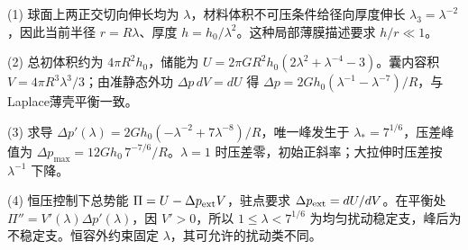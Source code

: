 (1) 球面上两正交切向伸长均为 \(\lambda\)，材料体积不可压条件给径向厚度伸长 \(\lambda_3=\lambda^{-2}\)，因此当前半径 \(r=R\lambda\)、厚度 \(h=h_0/\lambda^2\)。这种局部薄膜描述要求 \(h/r\ll1\)。

(2) 总初体积约为 \(4\pi R^2h_0\)，储能为 \(U=2\pi GR^2h_0(2\lambda^2+\lambda^{-4}-3)\)。囊内容积 \(V=4\pi R^3\lambda^3/3\)；由准静态外功 \(\Delta p\,dV=dU\) 得 \(\Delta p=2Gh_0(\lambda^{-1}-\lambda^{-7})/R\)，与Laplace薄壳平衡一致。

(3) 求导 \(\Delta p'(\lambda)=2Gh_0(-\lambda^{-2}+7\lambda^{-8})/R\)，唯一峰发生于 \(\lambda_*=7^{1/6}\)，压差峰值为 \(\Delta p_{\max}=12Gh_0\,7^{-7/6}/R\)。\(\lambda=1\) 时压差零，初始正斜率；大拉伸时压差按 \(\lambda^{-1}\) 下降。

(4) 恒压控制下总势能 \(\Pi=U-\Delta p_{\rm ext}V\)，驻点要求 \(\Delta p_{\rm ext}=dU/dV\)。在平衡处 \(\Pi''=V'(\lambda)\Delta p'(\lambda)\)，因 \(V'>0\)，所以 \(1\le\lambda<7^{1/6}\) 为均匀扰动稳定支，峰后为不稳定支。恒容外约束固定 \(\lambda\)，其可允许的扰动类不同。
